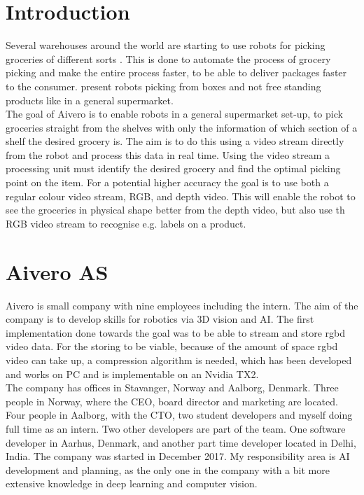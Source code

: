 \chapter{Introduction}\label{ch:intro}
Several warehouses around the world are starting to use robots for picking groceries of different sorts \citep{Olsen2018, Perez2018, Vincent2018}. This is done to automate the process of grocery picking and make the entire process faster, to be able to deliver packages faster to the consumer. \cite{Olsen2018, Perez2018, Vincent2018} present robots picking from boxes and not free standing products like in a general supermarket.\\

The goal of Aivero is to enable robots in a general supermarket set-up, to pick groceries straight from the shelves with only the information of which section of a shelf the desired grocery is. The aim is to do this using a video stream directly from the robot and process this data in real time. Using the video stream a processing unit must identify the desired grocery and find the optimal picking point on the item. For a potential higher accuracy the goal is to use both a regular colour video stream, RGB, and depth video. This will enable the robot to see the groceries in physical shape better from the depth video, but also use th RGB video stream to recognise e.g. labels on a product.

\chapter{Aivero AS}
Aivero is small company with nine employees including the intern. The aim of the company is to develop skills for robotics via 3D vision and AI. The first implementation done towards  the goal was to be able to stream and store \gls{rgbd} video data. For the storing to be viable, because of the amount of space \gls{rgbd} video can take up, a compression algorithm is needed, which has been developed and works on PC and is implementable on an Nvidia TX2.\\

The company has offices in Stavanger, Norway and Aalborg, Denmark. Three people in Norway, where the CEO, board director and marketing are located. Four people in Aalborg, with the CTO, two student developers and myself doing full time as an intern. Two other developers are part of the team. One software developer in Aarhus, Denmark, and another part time developer located in Delhi, India. The company was started in December 2017. My responsibility area is AI development and planning, as the only one in the company with a bit more extensive knowledge in deep learning and computer vision.


